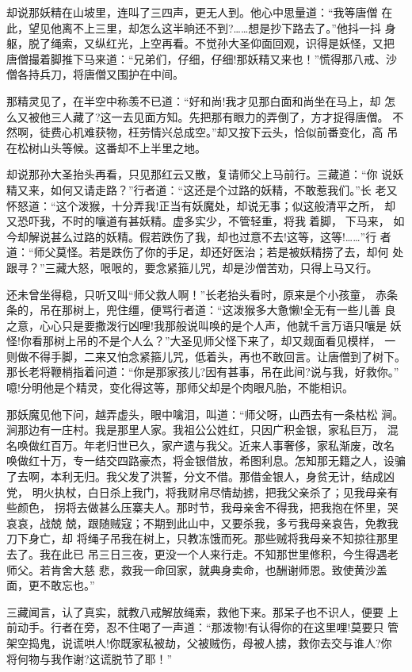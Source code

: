 却说那妖精在山坡里，连叫了三四声，更无人到。他心中思量道：“我等唐僧
在此，望见他离不上三里，却怎么这半晌还不到?……想是抄下路去了。”他抖一抖
身躯，脱了绳索，又纵红光，上空再看。不觉孙大圣仰面回观，识得是妖怪，又把
唐僧撮着脚推下马来道：“兄弟们，仔细，仔细!那妖精又来也！”慌得那八戒、沙
僧各持兵刀，将唐僧又围护在中间。

那精灵见了，在半空中称羡不已道：“好和尚!我才见那白面和尚坐在马上，却
怎么又被他三人藏了?这一去见面方知。先把那有眼力的弄倒了，方才捉得唐僧。
不然啊，徒费心机难获物，枉劳情兴总成空。”却又按下云头，恰似前番变化，高
吊在松树山头等候。这番却不上半里之地。

却说那孙大圣抬头再看，只见那红云又散，复请师父上马前行。三藏道：“你
说妖精又来，如何又请走路？”行者道：“这还是个过路的妖精，不敢惹我们。”长
老又怀怒道：“这个泼猴，十分弄我!正当有妖魔处，却说无事；似这般清平之所，
却又恐吓我，不时的嚷道有甚妖精。虚多实少，不管轻重，将我着脚，下马来，
如今却解说甚么过路的妖精。假若跌伤了我，却也过意不去!这等，这等!……”行
者道：“师父莫怪。若是跌伤了你的手足，却还好医治；若是被妖精捞了去，却何
处跟寻？”三藏大怒，哏哏的，要念紧箍儿咒，却是沙僧苦劝，只得上马又行。

还未曾坐得稳，只听又叫“师父救人啊！”长老抬头看时，原来是个小孩童，
赤条条的，吊在那树上，兜住缰，便骂行者道：“这泼猴多大惫懒!全无有一些儿善
良之意，心心只是要撒泼行凶哩!我那般说叫唤的是个人声，他就千言万语只嚷是
妖怪!你看那树上吊的不是个人么？”大圣见师父怪下来了，却又觌面看见模样，
一则做不得手脚，二来又怕念紧箍儿咒，低着头，再也不敢回言。让唐僧到了树下。
那长老将鞭梢指着问道：“你是那家孩儿?因有甚事，吊在此间?说与我，好救你。”
噫!分明他是个精灵，变化得这等，那师父却是个肉眼凡胎，不能相识。

那妖魔见他下问，越弄虚头，眼中噙泪，叫道：“师父呀，山西去有一条枯松
涧。涧那边有一庄村。我是那里人家。我祖公公姓红，只因广积金银，家私巨万，
混名唤做红百万。年老归世已久，家产遗与我父。近来人事奢侈，家私渐废，改名
唤做红十万，专一结交四路豪杰，将金银借放，希图利息。怎知那无籍之人，设骗
了去啊，本利无归。我父发了洪誓，分文不借。那借金银人，身贫无计，结成凶党，
明火执杖，白日杀上我门，将我财帛尽情劫掳，把我父亲杀了；见我母亲有些颜色，
拐将去做甚么压寨夫人。那时节，我母亲舍不得我，把我抱在怀里，哭哀哀，战兢
兢，跟随贼寇；不期到此山中，又要杀我，多亏我母亲哀告，免教我刀下身亡，却
将绳子吊我在树上，只教冻饿而死。那些贼将我母亲不知掠往那里去了。我在此已
吊三日三夜，更没一个人来行走。不知那世里修积，今生得遇老师父。若肯舍大慈
悲，救我一命回家，就典身卖命，也酬谢师恩。致使黄沙盖面，更不敢忘也。”

三藏闻言，认了真实，就教八戒解放绳索，救他下来。那呆子也不识人，便要
上前动手。行者在旁，忍不住喝了一声道：“那泼物!有认得你的在这里哩!莫要只
管架空捣鬼，说谎哄人!你既家私被劫，父被贼伤，母被人掳，救你去交与谁人?你
将何物与我作谢?这谎脱节了耶！”

